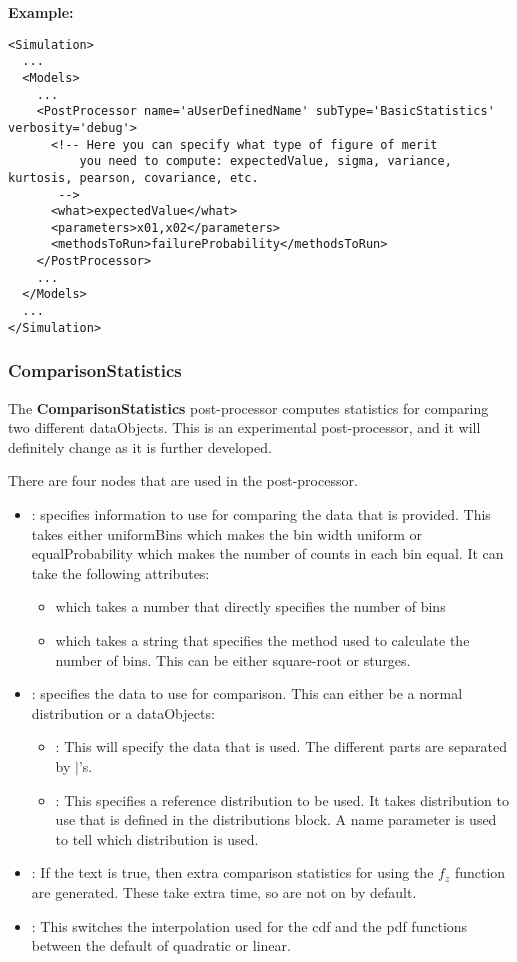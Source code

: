\textbf{Example:}
\begin{lstlisting}[style=XML,morekeywords={name,subType,debug}]
<Simulation>
  ...
  <Models>
    ...
    <PostProcessor name='aUserDefinedName' subType='BasicStatistics' verbosity='debug'>
      <!-- Here you can specify what type of figure of merit
          you need to compute: expectedValue, sigma, variance, kurtosis, pearson, covariance, etc.
       -->
      <what>expectedValue</what>
      <parameters>x01,x02</parameters>
      <methodsToRun>failureProbability</methodsToRun>
    </PostProcessor>
    ...
  </Models>
  ...
</Simulation>
\end{lstlisting}

\subsubsection{ComparisonStatistics}
\label{ComparisonStatistics}
The \textbf{ComparisonStatistics} post-processor computes statistics
for comparing two different dataObjects.  This is an experimental
post-processor, and it will definitely change as it is further
developed.

There are four nodes that are used in the post-processor.

\begin{itemize}
\item {}: specifies information to use for comparing the
  data that is provided.  This takes either uniformBins which makes
  the bin width uniform or equalProbability which makes the number
  of counts in each bin equal.  It can take the following attributes:
  \begin{itemize}
  \item {} which takes a number that directly
    specifies the number of bins
  \item {} which takes a string that specifies the
    method used to calculate the number of bins.  This can be either
    square-root or sturges.
  \end{itemize}
\item {}: specifies the data to use for comparison.
  This can either be a normal distribution or a dataObjects:
  \begin{itemize}
  \item {}: This will specify the data that is used.  The
    different parts are separated by $|$'s.
  \item {}: This specifies a reference distribution
    to be used.  It takes distribution to use that is defined in the
    distributions block.  A name parameter is used to tell which
    distribution is used.
  \end{itemize}
\item {}: If the text is true, then extra comparison
  statistics for using the $f_z$ function are generated.  These take
  extra time, so are not on by default.
\item {}: This switches the interpolation used
  for the cdf and the pdf functions between the default of quadratic
  or linear.
\end{itemize}

